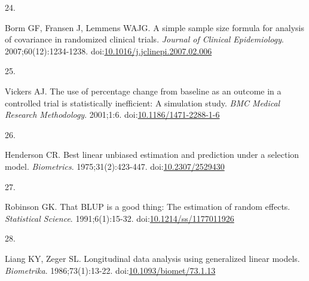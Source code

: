 \documentclass[
  11pt,
]{article}
\newlength{\cslhangindent}
\newlength{\csllabelwidth}
\newenvironment{CSLReferences}[2] %
 {\begin{list}{}{%
  \setlength{\itemindent}{0pt}
  \setlength{\leftmargin}{0pt}
  \setlength{\parsep}{0pt}
  \ifodd #1
   \setlength{\leftmargin}{\cslhangindent}
   \setlength{\itemindent}{-1\cslhangindent}
  \fi
  \setlength{\itemsep}{#2\baselineskip}}}
 {\end{list}}
\newcommand{\CSLLeftMargin}[1]{\parbox[t]{\csllabelwidth}{\strut#1\strut}}
\newcommand{\CSLRightInline}[1]{\parbox[t]{\linewidth - \csllabelwidth}{\strut#1\strut}}
\begin{document}
\begin{CSLReferences}{0}{1}
\CSLLeftMargin{24. }%
\CSLRightInline{Borm GF, Fransen J, Lemmens WAJG. A simple sample size formula for analysis of covariance in randomized clinical trials. \emph{Journal of Clinical Epidemiology}. 2007;60(12):1234-1238. doi:\href{https://doi.org/10.1016/j.jclinepi.2007.02.006}{10.1016/j.jclinepi.2007.02.006}}

\CSLLeftMargin{25. }%
\CSLRightInline{Vickers AJ. The use of percentage change from baseline as an outcome in a controlled trial is statistically inefficient: A simulation study. \emph{BMC Medical Research Methodology}. 2001;1:6. doi:\href{https://doi.org/10.1186/1471-2288-1-6}{10.1186/1471-2288-1-6}}

\CSLLeftMargin{26. }%
\CSLRightInline{Henderson CR. Best linear unbiased estimation and prediction under a selection model. \emph{Biometrics}. 1975;31(2):423-447. doi:\href{https://doi.org/10.2307/2529430}{10.2307/2529430}}

\CSLLeftMargin{27. }%
\CSLRightInline{Robinson GK. That {BLUP} is a good thing: The estimation of random effects. \emph{Statistical Science}. 1991;6(1):15-32. doi:\href{https://doi.org/10.1214/ss/1177011926}{10.1214/ss/1177011926}}

\CSLLeftMargin{28. }%
\CSLRightInline{Liang KY, Zeger SL. Longitudinal data analysis using generalized linear models. \emph{Biometrika}. 1986;73(1):13-22. doi:\href{https://doi.org/10.1093/biomet/73.1.13}{10.1093/biomet/73.1.13}}

\end{CSLReferences}
\end{document}
